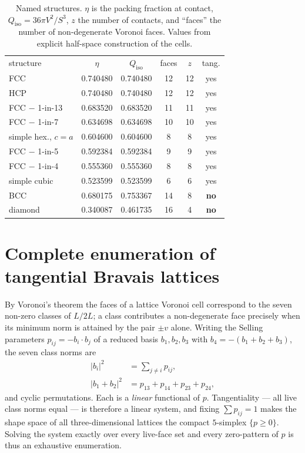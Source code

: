 \documentclass[11pt]{article}
\newenvironment{ruledtabular}{}{}
\begin{document}
\begin{table}[t]
\caption{Named structures. $\eta$ is the packing fraction at contact,
$Q_{\mathrm{iso}}=36\pi V^2/S^3$, $z$ the number of contacts, and ``faces'' the
number of non-degenerate Voronoi faces. Values from explicit half-space
construction of the cells.}
\label{tab:named}
\begin{ruledtabular}
\begin{tabular}{lccccc}
structure & $\eta$ & $Q_{\mathrm{iso}}$ & faces & $z$ & tang.\\
\colrule
FCC & 0.740480 & 0.740480 & 12 & 12 & yes\\
HCP & 0.740480 & 0.740480 & 12 & 12 & yes\\
FCC $-$ 1-in-13 & 0.683520 & 0.683520 & 11 & 11 & yes\\
FCC $-$ 1-in-7  & 0.634698 & 0.634698 & 10 & 10 & yes\\
simple hex., $c=a$ & 0.604600 & 0.604600 & 8 & 8 & yes\\
FCC $-$ 1-in-5  & 0.592384 & 0.592384 & 9 & 9 & yes\\
FCC $-$ 1-in-4  & 0.555360 & 0.555360 & 8 & 8 & yes\\
simple cubic & 0.523599 & 0.523599 & 6 & 6 & yes\\
BCC & 0.680175 & 0.753367 & 14 & 8 & \textbf{no}\\
diamond & 0.340087 & 0.461735 & 16 & 4 & \textbf{no}\\
\end{tabular}
\end{ruledtabular}
\end{table}

\section{Complete enumeration of tangential Bravais lattices}
\label{sec:enum}

By Voronoi's theorem the faces of a lattice Voronoi cell correspond to the seven
non-zero classes of $L/2L$; a class contributes a non-degenerate face precisely
when its minimum norm is attained by the pair $\pm v$ alone. Writing the Selling
parameters $p_{ij}=-b_i\cdot b_j$ of a reduced basis $b_1,b_2,b_3$ with
$b_4=-(b_1+b_2+b_3)$, the seven class norms are
\begin{align}
|b_i|^2 &= \textstyle\sum_{j\neq i} p_{ij},\\
|b_1+b_2|^2 &= p_{13}+p_{14}+p_{23}+p_{24},
\end{align}
and cyclic permutations. Each is a \emph{linear} functional of $p$. Tangentiality
--- all live class norms equal --- is therefore a linear system, and fixing
$\sum p_{ij}=1$ makes the shape space of all three-dimensional lattices the
compact $5$-simplex $\{p\geq0\}$. Solving the system exactly over every live-face
set and every zero-pattern of $p$ is thus an exhaustive enumeration.
\end{document}
